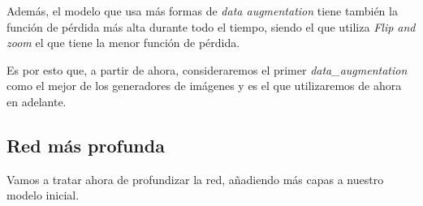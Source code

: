 \documentclass[11pt]{article}
\begin{document}
Además, el modelo que usa más formas de \emph{data augmentation} tiene
también la función de pérdida más alta durante todo el tiempo, siendo el
que utiliza \emph{Flip and zoom} el que tiene la menor función de
pérdida.

Es por esto que, a partir de ahora, consideraremos el primer
\emph{data\_augmentation} como el mejor de los generadores de imágenes y
es el que utilizaremos de ahora en adelante.

    \hypertarget{red-muxe1s-profunda}{%
\subsection{Red más profunda}\label{red-muxe1s-profunda}}

Vamos a tratar ahora de profundizar la red, añadiendo más capas a
nuestro modelo inicial.
\end{document}
